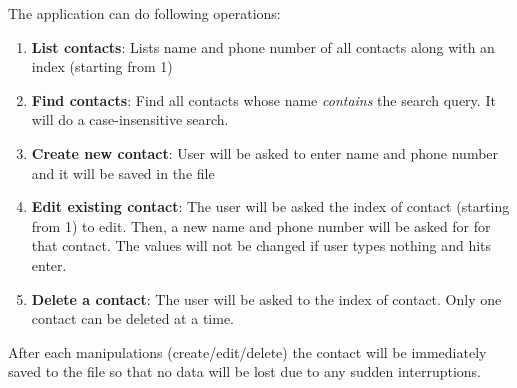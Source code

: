 \documentclass[12pt, a4paper]{article}
\begin{document}
\noindent
The application can do following operations:
\newcommand{\term}[1]{\textbf{#1}}
\begin{enumerate}
	\item \term{List contacts}: Lists name and phone number of all contacts along with an index (starting from 1)
	\item \term{Find contacts}: Find all contacts whose name \textit{contains} the search query. It will do a case-insensitive search.
	\item \term{Create new contact}: User will be asked to enter name and phone number and it will be saved in the file
	\item \term{Edit existing contact}: The user will be asked the index of contact (starting from 1) to edit. Then, a new name and phone number will be asked for for that contact. The values will not be changed if user types nothing and hits enter.
	\item \term{Delete a contact}: The user will be asked to the index of contact. Only one contact can be deleted at a time.	
\end{enumerate}

After each manipulations (create/edit/delete) the contact will be immediately saved to the file so that no data will be lost due to any sudden interruptions.

\vspace*{1cm}


\vspace*{.3cm}
\end{document}
